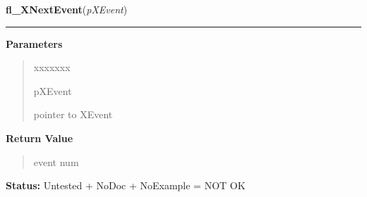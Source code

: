 \hspace{.8\funcindent}\begin{boxedminipage}{\funcwidth}

    \raggedright \textbf{fl\_XNextEvent}(\textit{pXEvent})

    \vspace{-1.5ex}

    \rule{\textwidth}{0.5\fboxrule}
\setlength{\parskip}{2ex}
\setlength{\parskip}{1ex}
      \textbf{Parameters}
      \vspace{-1ex}

      \begin{quote}
        \begin{Ventry}{xxxxxxx}

          \item[pXEvent]

          pointer to XEvent

        \end{Ventry}

      \end{quote}

      \textbf{Return Value}
    \vspace{-1ex}

      \begin{quote}
      event num

      \end{quote}

\textbf{Status:} Untested + NoDoc + NoExample = NOT OK



    \end{boxedminipage}

    \label{xformslib:library:fl_XPeekEvent}

    \vspace{0.5ex}


